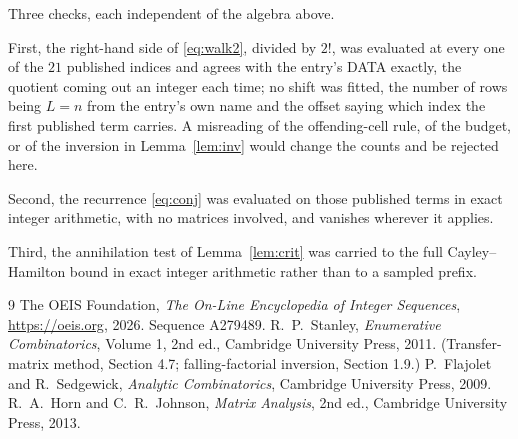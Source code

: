 \documentclass[11pt,a4paper]{article}
\theoremstyle{plain}
\theoremstyle{definition}
\begin{document}
Three checks, each independent of the algebra above.

First, the right-hand side of \eqref{eq:walk2}, divided by $2!$, was evaluated at every
one of the $21$ published indices and agrees with the entry's DATA exactly, the quotient
coming out an integer each time; no shift was fitted, the number of rows being
$L=n$ from the entry's own name and the offset saying which index the first published
term carries. A misreading of the offending-cell rule, of the budget, or of the inversion in
Lemma~\ref{lem:inv} would change the counts and be rejected here.

Second, the recurrence \eqref{eq:conj} was evaluated on those published terms in exact
integer arithmetic, with no matrices involved, and vanishes wherever it applies.

Third, the annihilation test of Lemma~\ref{lem:crit} was carried to the full
Cayley--Hamilton bound in exact integer arithmetic rather than to a sampled prefix.

\begin{thebibliography}{9}
 The OEIS Foundation, \emph{The On-Line Encyclopedia of Integer
Sequences}, \url{https://oeis.org}, 2026. Sequence A279489.
 R.~P.~Stanley, \emph{Enumerative Combinatorics}, Volume 1, 2nd ed.,
Cambridge University Press, 2011. (Transfer-matrix method, Section 4.7; falling-factorial
inversion, Section 1.9.)
 P.~Flajolet and R.~Sedgewick, \emph{Analytic Combinatorics}, Cambridge
University Press, 2009.
 R.~A.~Horn and C.~R.~Johnson, \emph{Matrix Analysis}, 2nd ed., Cambridge
University Press, 2013.
\end{thebibliography}
\end{document}
